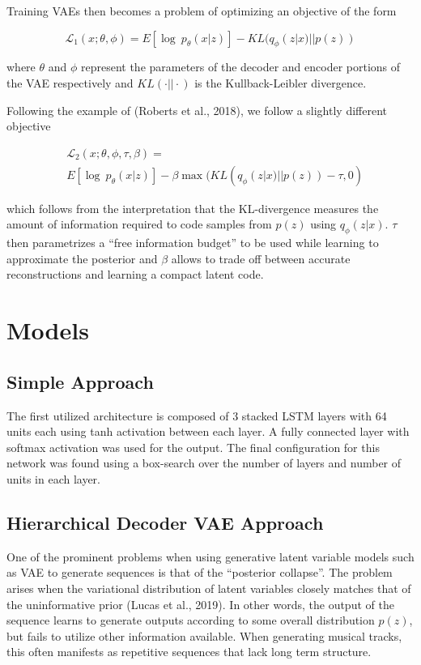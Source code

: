 \documentclass[10pt,twocolumn]{article}
\begin{document}
Training VAEs then becomes a problem of optimizing an objective of the form 

\[
  \mathcal{L}_1(x; \theta, \phi) = E[\log ~ p_\theta (x | z)] - KL(q_\phi(z | x) || p(z))
\]

where $\theta$ and $\phi$ represent the parameters of the decoder and encoder portions of the VAE respectively and $KL(\cdot || \cdot)$ is the Kullback-Leibler divergence.

Following the example of (Roberts et al., 2018), we follow a slightly different objective 

\begin{align*}
  & \mathcal{L}_2(x; \theta, \phi, \tau, \beta) = \\
   & E[\log ~ p_\theta (x | z)] - \beta \max(KL(q_\phi(z | x) || p(z)) - \tau, 0)
\end{align*}

which follows from the interpretation that the KL-divergence measures the amount of information required to code samples from $p(z)$ using $q_\phi(z | x)$. $\tau$ then parametrizes a ``free information budget'' to be used while learning to approximate the posterior and $\beta$ allows to trade off between accurate reconstructions and learning a compact latent code.

\section{Models}
\subsection{Simple Approach}
 The first utilized architecture is composed of 3 stacked LSTM layers with 64 units each using tanh activation between each layer. A fully connected layer with softmax activation was used for the output. The final configuration for this network was found using a box-search over the number of layers and number of units in each layer.

\subsection{Hierarchical Decoder VAE Approach}

One of the prominent problems when using generative latent variable models such as VAE to generate sequences is that of the ``posterior collapse''. The problem arises when the variational distribution of latent variables closely matches that of the uninformative prior (Lucas et al., 2019)\cite{lucas2019understanding}. In other words, the output of the sequence learns to generate outputs according to some overall distribution $p(z)$, but fails to utilize other information available. When generating musical tracks, this often manifests as repetitive sequences that lack long term structure.
\end{document}
